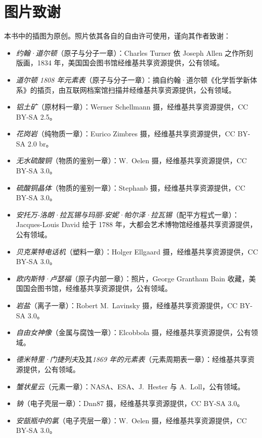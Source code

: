 \chapter*{图片致谢}

本书中的插图为原创。照片依其各自的自由许可使用，谨向其作者致谢：

\begin{itemize}
  \item \emph{约翰·道尔顿}（原子与分子一章）：Charles Turner 依 Joseph Allen 之作所刻版画，1834 年，美国国会图书馆经维基共享资源提供，公有领域。
  \item \emph{道尔顿 1808 年元素表}（原子与分子一章）：摘自约翰·道尔顿《化学哲学新体系》的插页，由互联网档案馆扫描并经维基共享资源提供，公有领域。
  \item \emph{铝土矿}（原材料一章）：Werner Schellmann 摄，经维基共享资源提供，CC BY-SA 2.5。
  \item \emph{花岗岩}（纯物质一章）：Eurico Zimbres 摄，经维基共享资源提供，CC BY-SA 2.0 br。
  \item \emph{无水硫酸铜}（物质的鉴别一章）：W.~Oelen 摄，经维基共享资源提供，CC BY-SA 3.0。
  \item \emph{硫酸铜晶体}（物质的鉴别一章）：Stephanb 摄，经维基共享资源提供，CC BY-SA 3.0。
  \item \emph{安托万-洛朗·拉瓦锡与玛丽-安妮·帕尔泽·拉瓦锡}（配平方程式一章）：Jacques-Louis David 绘于 1788 年，大都会艺术博物馆经维基共享资源提供，公有领域。
  \item \emph{贝克莱特电话机}（塑料一章）：Holger Ellgaard 摄，经维基共享资源提供，CC BY-SA 3.0。
  \item \emph{欧内斯特·卢瑟福}（原子内部一章）：照片，George Grantham Bain 收藏，美国国会图书馆，经维基共享资源提供，公有领域。
  \item \emph{岩盐}（离子一章）：Robert M.~Lavinsky 摄，经维基共享资源提供，CC BY-SA 3.0。
  \item \emph{自由女神像}（金属与腐蚀一章）：Elcobbola 摄，经维基共享资源提供，公有领域。
  \item \emph{德米特里·门捷列夫}及其\emph{1869 年的元素表}（元素周期表一章）：经维基共享资源提供，公有领域。
  \item \emph{蟹状星云}（元素一章）：NASA、ESA、J.~Hester 与 A.~Loll，公有领域。
  \item \emph{钠}（电子壳层一章）：Dnn87 摄，经维基共享资源提供，CC BY-SA 3.0。
  \item \emph{安瓿瓶中的氯}（电子壳层一章）：W.~Oelen 摄，经维基共享资源提供，CC BY-SA 3.0。

\end{itemize}
